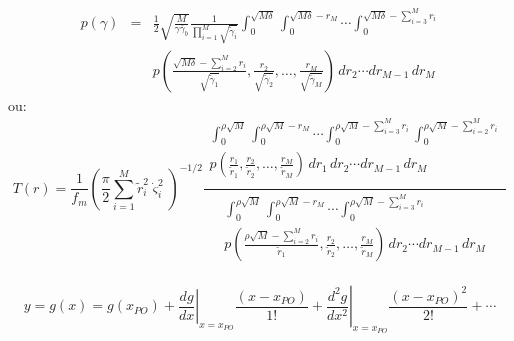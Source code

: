 \begin{eqnarray} \label{eq:PDF:RSR}
  p \left( \gamma \right) & = & \frac{1}{2} \sqrt{\frac{M}{\gamma \bar{\gamma}_{b}}} \frac{1}{ \prod_{i=1}^M {\sqrt{\tilde{\gamma}_i}}}
  \int_0^{\sqrt{M \delta}} \int_0^{\sqrt{M \delta} - r_M } \cdots
  \int_0^{\sqrt{M \delta} - \sum_{i = 3}^M {r_i } } \nonumber \\
  & & p \left( {\frac{\sqrt{M \delta} - \sum_{i = 2}^M {r_i }}{\sqrt{\tilde{\gamma}_1}} ,
  \frac{r_2}{\sqrt{\tilde{\gamma}_2}} , \ldots ,\frac{r_M}{\sqrt{\tilde{\gamma}_M}} } \right)
  \, dr_2 \cdots dr_{M-1} \, dr_M
\end{eqnarray}
ou:
\begin{equation} \label{eq:TrCGI}
  T(r) = \frac{1}{f_m}
  \left( \frac{\pi}{2} \sum_{i=1}^M
  {\tilde{r}_i^2 \dot{\varsigma}_i^2}\right)^{-1/2}
  \frac
  {\begin{array}{ll}
  \int_0^{\rho \sqrt{M}} \int_0^{\rho \sqrt{M} - r_M } \cdots
  \int_0^{\rho \sqrt{M} - \sum_{i = 3}^M {r_i } } \int_0^{\rho \sqrt{M} -
  \sum_{i = 2}^M {r_i } }  \\
  p \left( {\frac{r_1}{\tilde{r}_1} ,
  \frac{r_2}{\tilde{r}_2} , \ldots ,\frac{r_M}{\tilde{r}_M} } \right)
  \, dr_1 \, dr_2 \cdots dr_{M-1} \, dr_M \\ \end{array}}
  {\begin{array}{ll}
  \int_0^{\rho \sqrt{M}} \int_0^{\rho \sqrt{M} - r_M } \cdots
  \int_0^{\rho \sqrt{M} - \sum_{i = 3}^M {r_i } } \\
  p \left( {\frac{\rho \sqrt{M} - \sum_{i = 2}^M {r_i }}{\tilde{r}_1} ,
  \frac{r_2}{\tilde{r}_2} , \ldots ,\frac{r_M}{\tilde{r}_M} } \right)
  \, dr_2 \cdots dr_{M-1} \, dr_M \\ \end{array}}
\end{equation}


\begin{equation}
y = g(x) = g(x_{PO}) + \left.\frac{dg}{dx}\right|_{x=x_{PO}}
\frac{(x-x_{PO})}{1!} + \left.\frac{d^2g}{dx^2}\right|_{x=x_{PO}}
\frac{(x-x_{PO})^2}{2!} + \cdots
\label{Eq:Taylor}
\end{equation}


